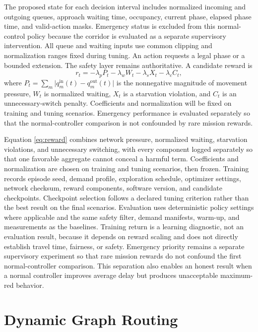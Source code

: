 The proposed state for each decision interval includes normalized incoming and outgoing queues, approach waiting time, occupancy, current phase, elapsed phase time, and valid-action masks. Emergency status is excluded from this normal-control policy because the corridor is evaluated as a separate supervisory intervention. All queue and waiting inputs use common clipping and normalization ranges fixed during tuning. An action requests a legal phase or a bounded extension. The safety layer remains authoritative. A candidate reward is
\begin{equation}
r_t=-\lambda_p P_t-\lambda_w W_t-\lambda_s X_t-\lambda_c C_t,
\label{eq:reward}
\end{equation}
where $P_t=\sum_m\lvert q_m^{\mathrm{in}}(t)-q_m^{\mathrm{out}}(t)\rvert$ is the nonnegative magnitude of movement pressure, $W_t$ is normalized waiting, $X_t$ is a starvation violation, and $C_t$ is an unnecessary-switch penalty. Coefficients and normalization will be fixed on training and tuning scenarios. Emergency performance is evaluated separately so that the normal-controller comparison is not confounded by rare mission rewards.

Equation \ref{eq:reward} combines network pressure, normalized waiting, starvation violations, and unnecessary switching, with every component logged separately so that one favorable aggregate cannot conceal a harmful term. Coefficients and normalization are chosen on training and tuning scenarios, then frozen. Training records episode seed, demand profile, exploration schedule, optimizer settings, network checksum, reward components, software version, and candidate checkpoints. Checkpoint selection follows a declared tuning criterion rather than the best result on the final scenarios. Evaluation uses deterministic policy settings where applicable and the same safety filter, demand manifests, warm-up, and measurements as the baselines. Training return is a learning diagnostic, not an evaluation result, because it depends on reward scaling and does not directly establish travel time, fairness, or safety. Emergency priority remains a separate supervisory experiment so that rare mission rewards do not confound the first normal-controller comparison. This separation also enables an honest result when a normal controller improves average delay but produces unacceptable maximum-red behavior.

\section{Dynamic Graph Routing}

